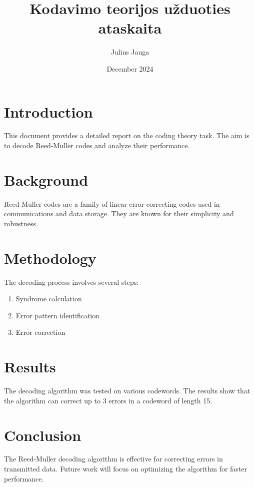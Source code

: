 \documentclass{article}
\title{Kodavimo teorijos užduoties ataskaita}
\author{Julius Jauga}
\date{December 2024}
\begin{document}
\maketitle

\section{Introduction}
This document provides a detailed report on the coding theory task. The aim is to decode Reed-Muller codes and analyze their performance.

\section{Background}
Reed-Muller codes are a family of linear error-correcting codes used in communications and data storage. They are known for their simplicity and robustness.

\section{Methodology}
The decoding process involves several steps:
\begin{enumerate}
    \item Syndrome calculation
    \item Error pattern identification
    \item Error correction
\end{enumerate}

\section{Results}
The decoding algorithm was tested on various codewords. The results show that the algorithm can correct up to 3 errors in a codeword of length 15.

\section{Conclusion}
The Reed-Muller decoding algorithm is effective for correcting errors in transmitted data. Future work will focus on optimizing the algorithm for faster performance.
\end{document}
